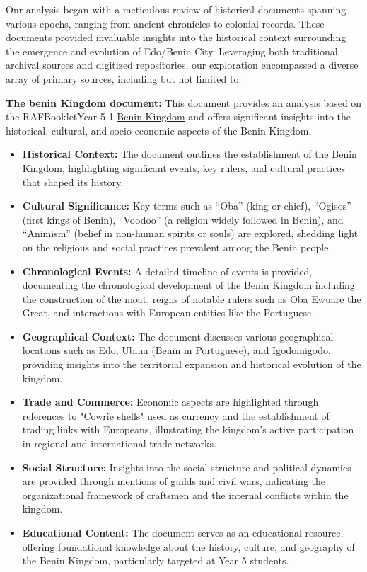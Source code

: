 Our analysis began with a meticulous review of historical documents spanning various epochs, ranging from ancient chronicles to colonial records. These documents provided invaluable insights into the historical context surrounding the emergence and evolution of Edo/Benin City. Leveraging both traditional archival sources and digitized repositories, our exploration encompassed a diverse array of primary sources, including but not limited to:

\textbf{The benin Kingdom document:}
This document provides an analysis based on the RAFBookletYear-5-1 \href{https://denhamgreenacademy.e-act.org.uk/wp-content/uploads/sites/5/2020/10/RAFBookletYear-5-1Benin-Kingdom-paper-size-297x21-cmUPDATED.210187322-wecompress.com_.pdf}{Benin-Kingdom} and offers significant insights into the historical, cultural, and socio-economic aspects of the Benin Kingdom.


\begin{itemize}
  \item \textbf{Historical Context:} The document outlines the establishment of the Benin Kingdom, highlighting significant events, key rulers, and cultural practices that shaped its history.
  \item \textbf{Cultural Significance:} Key terms such as ``Oba'' (king or chief), ``Ogisos'' (first kings of Benin), ``Voodoo'' (a religion widely followed in Benin), and ``Animism'' (belief in non-human spirits or souls) are explored, shedding light on the religious and social practices prevalent among the Benin people.
  \item \textbf{Chronological Events:} A detailed timeline of events is provided, documenting the chronological development of the Benin Kingdom including the construction of the moat, reigns of notable rulers such as Oba Ewuare the Great, and interactions with European entities like the Portuguese.
  \item \textbf{Geographical Context:} The document discusses various geographical locations such as Edo, Ubinu (Benin in Portuguese), and Igodomigodo, providing insights into the territorial expansion and historical evolution of the kingdom.
  \item \textbf{Trade and Commerce:} Economic aspects are highlighted through references to "Cowrie shells" used as currency and the establishment of trading links with Europeans, illustrating the kingdom's active participation in regional and international trade networks.
  \item \textbf{Social Structure:} Insights into the social structure and political dynamics are provided through mentions of guilds and civil wars, indicating the organizational framework of craftsmen and the internal conflicts within the kingdom.
  \item \textbf{Educational Content:} The document serves as an educational resource, offering foundational knowledge about the history, culture, and geography of the Benin Kingdom, particularly targeted at Year 5 students.
\end{itemize}
